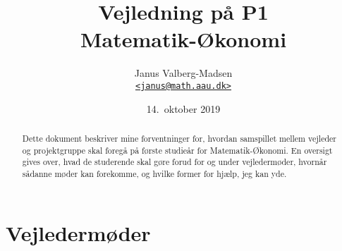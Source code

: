 \documentclass[12pt,oneside,final]{article}
\title{
  Vejledning på P1\\
  Matematik-{\O}konomi
}
\author{
  Janus Valberg-Madsen\\
  \href{mailto:janus@math.aau.dk}{\texttt{<janus@math.aau.dk>}}
}
\date{14.\ oktober 2019}
\begin{document}
\maketitle

\renewcommand{\abstractname}{Om dette dokument}
\begin{abstract}
  Dette dokument beskriver mine forventninger for, hvordan samspillet mellem vejleder og projektgruppe skal foregå på første studieår for Matematik-Økonomi.
  En oversigt gives over, hvad de studerende skal gøre forud for og under vejledermøder, hvornår sådanne møder kan forekomme, og hvilke former for hjælp, jeg kan yde.
\end{abstract}


\section{Vejledermøder}
\end{document}
